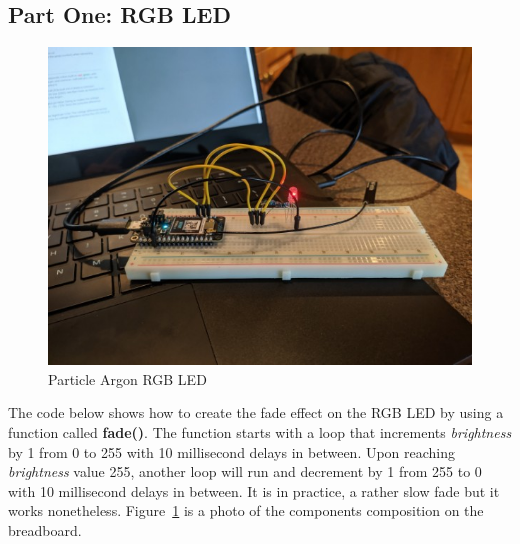 \documentclass{article}
\begin{document}
\subsection{Part One: RGB LED}
\begin{figure}[H]
\center
\includegraphics[width=\textwidth]{images/fade.jpeg}
\caption{Particle Argon RGB LED}
\label{fig:fade}
\end{figure}

The code below shows how to create the fade effect on the RGB LED by using a function called \textbf{fade()}. The function starts with a loop that increments \textit{brightness} by 1 from 0 to 255 with 10 millisecond delays in between. Upon reaching \textit{brightness} value 255, another loop will run and decrement by 1 from 255 to 0 with 10 millisecond delays in between. It is in practice, a rather slow fade but it works nonetheless. Figure~\ref{fig:fade} is a photo of the components composition on the breadboard.\\


\end{document}
